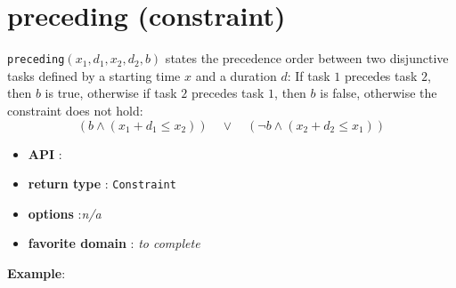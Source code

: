 \label{preceding}
\hypertarget{preceding}{}

\section{preceding (constraint)}\label{preceding:precedingconstraint}\hypertarget{preceding:precedingconstraint}{}
\begin{notedef}

\texttt{preceding}$(x_1,d_1,x_2,d_2,b)$ states the precedence order between two disjunctive tasks defined by a starting time $x$ and a duration $d$: If task $1$ precedes task $2$, then $b$ is true, otherwise if task $2$ precedes task $1$, then $b$ is false, otherwise the constraint does not hold:
$$(b \land (x_1 + d_1 \le x_2))\quad \lor\quad (\neg b \land (x_2 + d_2 \le x_1))$$
\end{notedef}

\begin{itemize}
	\item \textbf{API} : 
	\item \textbf{return type} : \texttt{Constraint}
	\item \textbf{options} :\emph{n/a}
	\item \textbf{favorite domain} : \emph{to complete}
\end{itemize}

\textbf{Example}:
